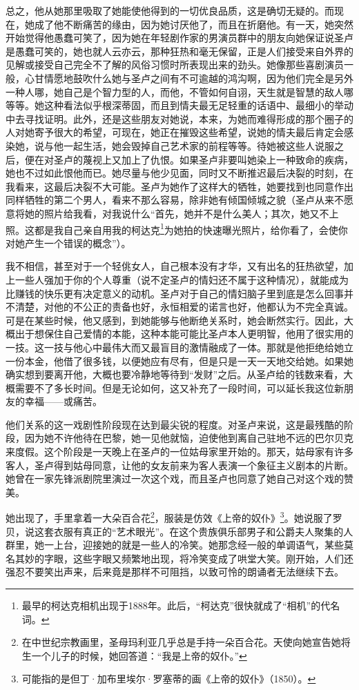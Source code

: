 \par 总之，他从她那里吸取了她能使他得到的一切优良品质，这是确切无疑的。而现在，她成了他不断痛苦的缘由，因为她讨厌他了，而且在折磨他。有一天，她突然开始觉得他愚蠢可笑了，因为她在年轻剧作家的男演员群中的朋友向她保证说圣卢是愚蠢可笑的，她也就人云亦云，那种狂热和毫无保留，正是人们接受来自外界的见解或接受自己完全不了解的风俗习惯时所表现出来的劲头。她像那些喜剧演员一般，心甘情愿地鼓吹什么她与圣卢之间有不可逾越的鸿沟啊，因为他们完全是另外一种人哪，她自己是个智力型的人，而他，不管如何自诩，天生就是智慧的敌人哪等等。她这种看法似乎根深蒂固，而且到情夫最无足轻重的话语中、最细小的举动中去寻找证明。此外，还是这些朋友对她说，本来，为她而难得形成的那个圈子的人对她寄予很大的希望，可现在，她正在摧毁这些希望，说她的情夫最后肯定会感染她，说与他一起生活，她会毁掉自己艺术家的前程等等。待她被这些人说服之后，便在对圣卢的蔑视上又加上了仇恨。如果圣卢非要叫她染上一种致命的疾病，她也不过如此恨他而已。她尽量与他少见面，同时又不断推迟最后决裂的时刻，在我看来，这最后决裂不大可能。圣卢为她作了这样大的牺牲，她要找到也同意作出同样牺牲的第二个男人，看来不那么容易，除非她有倾国倾城之貌（圣卢从来不愿意将她的照片给我看，对我说什么“首先，她并不是什么美人；其次，她又不上照。这都是我自己亲自用我的柯达克\footnote{最早的柯达克相机出现于1888年。此后，“柯达克”很快就成了“相机”的代名词。}为她拍的快速曝光照片，给你看了，会使你对她产生一个错误的概念”）。
\par 我不相信，甚至对于一个轻佻女人，自己根本没有才华，又有出名的狂热欲望，加上一些人强加于你的个人尊重（说不定圣卢的情妇还不属于这种情况），就能成为比赚钱的快乐更有决定意义的动机。圣卢对于自己的情妇脑子里到底是怎么回事并不清楚，对他的不公正的责备也好，永恒相爱的诺言也好，他都认为不完全真诚。可是在某些时候，他又感到，到她能够与他断绝关系时，她会断然实行。因此，大概出于想保住自己爱情的本能，这种本能可能比圣卢本人更明智，他用了很实用的一技。这一技与他心中最伟大而又最盲目的激情融成了一体。那就是他拒绝给她立一份本金，他借了很多钱，以便她应有尽有，但是只是一天一天地交给她。如果她确实想到要离开他，大概也要冷静地等待到“发财”之后。从圣卢给的钱数来看，大概需要不了多长时间。但是无论如何，这又补充了一段时间，可以延长我这位新朋友的幸福——或痛苦。
\par 他们关系的这一戏剧性阶段现在达到最尖锐的程度。对圣卢来说，这是最残酷的阶段，因为她不许他待在巴黎，她一见他就恼，迫使他到离自己驻地不远的巴尔贝克来度假。这个阶段是一天晚上在圣卢的一位姑母家里开始的。那天，姑母家有许多客人，圣卢得到姑母同意，让他的女友前来为客人表演一个象征主义剧本的片断。她曾在一家先锋派剧院里演过一次这个戏，而且圣卢也同意了她自己对这个戏的赞美。
\par 她出现了，手里拿着一大朵百合花\footnote{在中世纪宗教画里，圣母玛利亚几乎总是手持一朵百合花。天使向她宣告她将生一个儿子的时候，她回答道：“我是上帝的奴仆。”}，服装是仿效《上帝的奴仆》\footnote{可能指的是但丁·加布里埃尔·罗塞蒂的画《上帝的奴仆》（1850）。}。她说服了罗贝，说这套衣服有真正的“艺术眼光”。在这个贵族俱乐部男子和公爵夫人聚集的人群里，她一上台，迎接她的就是一些人的冷笑。她那念经一般的单调语气，某些莫名其妙的字眼，这些字眼又频繁地出现，将冷笑变成了哄堂大笑。刚开始，人们还强忍不要笑出声来，后来竟是那样不可阻挡，以致可怜的朗诵者无法继续下去。
